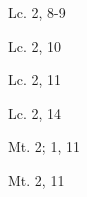 \documentclass[a4paper,11pt,sans]{article}
\begin{document}
      \begin{multicols}{2}

      \columnbreak
          
      \end{multicols}
      \begin{center}
        Lc. 2, 8-9         
      \end{center}
      
      \begin{multicols}{2}

      \columnbreak
          
      \end{multicols}
      \begin{center}
        Lc. 2, 10         
      \end{center}

      \begin{multicols}{2}

      \columnbreak
          
      \end{multicols}
      \begin{center}
        Lc. 2, 11       
      \end{center}
      
      \begin{multicols}{2}

      \columnbreak
          
      \end{multicols}
      \begin{center}
        Lc. 2, 14        
      \end{center}
      
      \begin{multicols}{2}

      \columnbreak
          
      \end{multicols}
      \begin{center}
        Mt. 2; 1, 11        
      \end{center}
      
      \begin{multicols}{2}

      \columnbreak
          
      \end{multicols}
      \begin{center}
        Mt. 2, 11         
      \end{center}      
      
\end{document}
